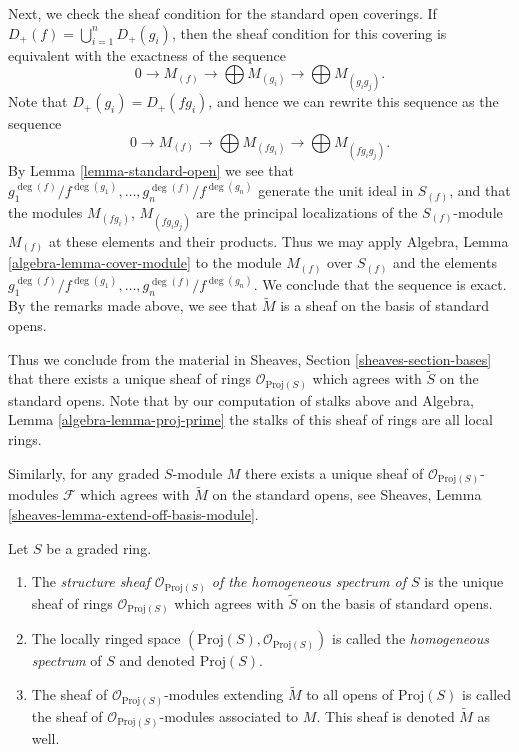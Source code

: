 \medskip\noindent
Next, we check the sheaf condition for the standard open coverings.
If $D_{+}(f) = \bigcup_{i = 1}^n D_{+}(g_i)$, then the sheaf condition
for this covering is equivalent with the exactness of the
sequence
$$
0 \to M_{(f)} \to \bigoplus M_{(g_i)} \to \bigoplus M_{(g_ig_j)}.
$$
Note that $D_{+}(g_i) = D_{+}(fg_i)$, and hence we can rewrite this
sequence as the sequence
$$
0 \to M_{(f)} \to \bigoplus M_{(fg_i)} \to \bigoplus M_{(fg_ig_j)}.
$$
By Lemma \ref{lemma-standard-open} we see that
$g_1^{\deg(f)}/f^{\deg(g_1)}, \ldots, g_n^{\deg(f)}/f^{\deg(g_n)}$
generate the unit ideal in $S_{(f)}$, and that the modules
$M_{(fg_i)}$, $M_{(fg_ig_j)}$ are the principal localizations
of the $S_{(f)}$-module $M_{(f)}$ at these elements and their products.
Thus we may apply Algebra, Lemma \ref{algebra-lemma-cover-module}
to the module $M_{(f)}$ over $S_{(f)}$ and the elements
$g_1^{\deg(f)}/f^{\deg(g_1)}, \ldots, g_n^{\deg(f)}/f^{\deg(g_n)}$.
We conclude that the sequence is exact. By the remarks
made above, we see that $\widetilde M$ is a sheaf
on the basis of standard opens.

\medskip\noindent
Thus we conclude from the material in
Sheaves, Section \ref{sheaves-section-bases}
that there exists a
unique sheaf of rings $\mathcal{O}_{\text{Proj}(S)}$
which agrees with $\widetilde S$ on the standard opens.
Note that by our computation of stalks above and
Algebra, Lemma \ref{algebra-lemma-proj-prime} the
stalks of this sheaf of rings are all local rings.

\medskip\noindent
Similarly, for any graded $S$-module $M$ there exists
a unique sheaf of $\mathcal{O}_{\text{Proj}(S)}$-modules
$\mathcal{F}$ which agrees with $\widetilde M$ on the
standard opens, see
Sheaves, Lemma \ref{sheaves-lemma-extend-off-basis-module}.

\begin{definition}
\label{definition-structure-sheaf}
Let $S$ be a graded ring.
\begin{enumerate}
\item The {\it structure sheaf $\mathcal{O}_{\text{Proj}(S)}$ of the
homogeneous spectrum of $S$} is the unique sheaf of rings
$\mathcal{O}_{\text{Proj}(S)}$
which agrees with $\widetilde S$ on the basis of standard opens.
\item The locally ringed space
$(\text{Proj}(S), \mathcal{O}_{\text{Proj}(S)})$ is called
the {\it homogeneous spectrum} of $S$ and denoted $\text{Proj}(S)$.
\item The sheaf of $\mathcal{O}_{\text{Proj}(S)}$-modules
extending $\widetilde M$ to all opens of $\text{Proj}(S)$
is called the sheaf of $\mathcal{O}_{\text{Proj}(S)}$-modules
associated to $M$. This sheaf is denoted $\widetilde M$ as
well.
\end{enumerate}
\end{definition}

